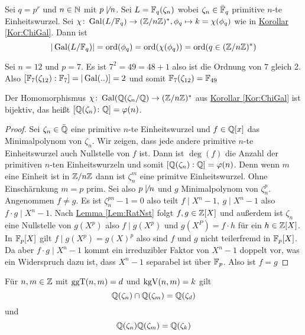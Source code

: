 \begin{Kor}
    Sei $q=p^r$ und $n\in\mathbb{N}$ mit $p\not\mid n$. Sei $L=\mathbb{F}_q(\zeta_n)$ wobei $\zeta_n\in\bar {\mathbb{F}}_q$ primitive $n$-te Einheitswurzel.
    Sei $\chi\colon \operatorname{Gal}(L/\mathbb{F}_q)\to (\mathbb{Z}/n\mathbb{Z})^*, \phi_q\mapsto k=\chi(\phi_q)$ wie in \hyperref[Kor:ChiGal]{Korollar} \ref{Kor:ChiGal}. Dann ist
    $$|\operatorname{Gal}(L/\mathbb{F}_q)|=\operatorname{ord}(\phi_q)=\operatorname{ord}(\chi(\phi_q))=\operatorname{ord}(q\in(\mathbb{Z}/n\mathbb{Z})^*)$$
\end{Kor}
\begin{Bsp}
  Sei $n=12$ und $p=7$. Es ist $7^2=49 =48+1$ also ist die Ordnung von $7$ gleich 2.
    Also $[\mathbb{F}_7(\zeta_{12}):\mathbb{F}_7]=|\operatorname{Gal}(..)]=2$ und somit $\mathbb{F}_7(\zeta_{12})=\mathbb{F}_{49}$
\end{Bsp}
\begin{Satz}
    Der Homomorphismus $\chi\colon\operatorname{Gal}(\mathbb{Q}(\zeta_n/\mathbb{Q})\to(\mathbb{Z}/n\mathbb{Z})^*$ aus \hyperref[Kor:ChiGal]{Korollar \ref{Kor:ChiGal}} ist bijektiv, das heißt $[\mathbb{Q}(\zeta_n)\colon \mathbb{Q}]=\varphi(n)$.
\end{Satz}
\begin{proof}
    Sei $\zeta_n\in\bar{\mathbb{Q}}$ eine primitive $n$-te Einheitswurzel und $f\in\mathbb{Q}[x]$ das Minimalpolynom von $\zeta_n$.
    Wir zeigen, dass jede andere primitive $n$-te Einheitswurzel auch Nullstelle von $f$ ist. Dann ist $
    \deg(f)$ die Anzahl der primitiven $n$-ten Einheitswurzeln und somit $[\mathbb{Q}(\zeta_n):\mathbb{Q}]=\varphi(n)$.
    Denn wenn $m$ eine Einheit ist in $\mathbb{Z}/n\mathbb{Z}$ dann ist $\zeta_n^m$ eine primitve Einheitswurzel.
    Ohne Einschärnkung $m=p$ prim.
    Sei also $p\not\mid n$ und $g$ Minimalpolynom von $\zeta_n^p$. Angenommen $f\neq g$.
    Es ist $\zeta_n^{pn}-1=0$ also teilt $f\mid X^n-1,\ g\mid X^n-1$ also $f\cdot g\mid X^n-1$. Nach \hyperref[Lem:RatNst]{Lemma \ref{Lem:RatNst}} folgt $f,g\in\mathbb{Z}[X]$ und außerdem ist $\zeta_n$ eine Nullstelle von $g(X^p)$ also $f\mid g(X^p)$ und $g(X^P)=f\cdot h$ für ein $h\in \mathbb{Z}[X]$.
    In $\mathbb{F}_p[X]$ gilt $f\mid g(X^p)=g(X)^p$ also sind $f$ und $g$ nicht teilerfremd in $\mathbb{F}_p[X]$. Da aber $f\cdot g\mid X^n-1$ kommt ein irreduzibler Faktor von $X^n-1$ doppelt vor, was ein Widerspruch dazu ist, dass $X^n-1$ separabel ist über $\mathbb{F}_p$.
    Also ist $f=g$
\end{proof}
\begin{Kor}
    Für $n,m\in\mathbb{Z}$ mit $\operatorname{ggT}(n,m)=d$ und $\operatorname{kgV}(n,m)=k$ gilt $$\mathbb{Q}(\zeta_n)\cap \mathbb{Q}(\zeta_m)=\mathbb{Q}(\zeta_d)$$ und $$\mathbb{Q}(\zeta_n)\mathbb{Q}(\zeta_m)=\mathbb{Q}(\zeta_k)$$
\end{Kor}
